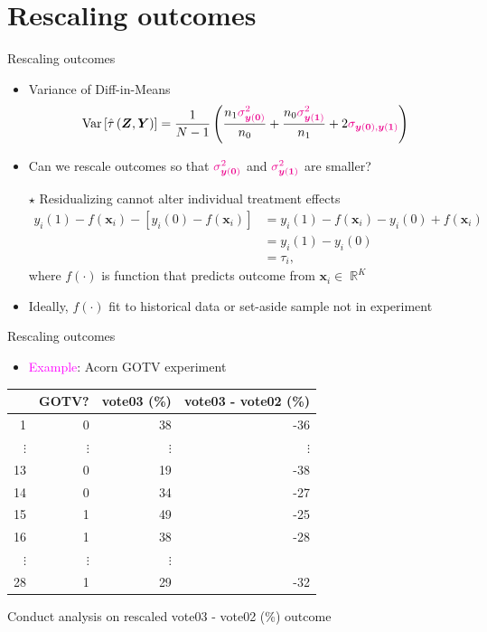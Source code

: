 \documentclass[table, xcolor = {dvipsnames}, 9pt]{beamer}
\theoremstyle{plain}
\newcommand{\mh}[1]{{\color{magenta}{#1}}}
\DeclareMathOperator{\R}{\mathbb{R}}
\DeclareMathOperator{\Var}{\rm{Var}}
\begin{document}
\section{Rescaling outcomes}
\begin{frame}{Rescaling outcomes}
\vfill
\begin{itemize} \vfill
\item Variance of Diff-in-Means \vfill
\begin{equation*}
\Var\left[\hat{\tau}\left(\bm{Z}, \bm{Y}\right)\right] = \frac{1}{N - 1}\left(\frac{n_1 \mh{\sigma^2_{\bm{y}(\bm{0})}}}{n_0} + \frac{n_0\mh{\sigma^2_{\bm{y}(\bm{1})}}}{n_1} + 2\mh{\sigma_{\bm{y}(\bm{0}), \bm{y}(\bm{1})}}\right)
\end{equation*} \vfill
\item Can we rescale outcomes so that $\mh{\sigma^2_{\bm{y}(\bm{0})}}$ and $\mh{\sigma^2_{\bm{y}(\bm{1})}}$ are smaller?  \vfill
\item[$\star$] Residualizing cannot alter individual treatment effects
\begin{align*}
y_{i}(1) - f(\bm{x}_i) - \left[y_{i}(0) - f(\bm{x}_i)\right] & = y_{i}(1) - f(\bm{x}_i) - y_{i}(0) + f(\bm{x}_i) \\ 
& = y_{i}(1) - y_{i}(0) \\ 
& = \tau_i,
\end{align*}\vfill
where $f(\cdot)$ is function that predicts outcome from $\bm{x}_i \in \R^K$ \\ 
\citep{rosenbaum2002c} \vfill
\item Ideally, $f(\cdot)$ fit to historical data or set-aside sample not in experiment \vfill
\end{itemize} \vfill
\end{frame}
\begin{frame}{Rescaling outcomes}
\vfill
\begin{itemize} \vfill
\item \textcolor{magenta}{Example}: Acorn GOTV experiment \citep{arceneaux2005}
\end{itemize} 
\begin{center}
  \begin{tabular}{r|rrr}
  \hline
 & GOTV? & vote03 (\%) & vote03 - vote02 (\%) \\
  \hline
1 & 0 & 38 & -36 \\
$\vdots$& $\vdots$& $\vdots$ & $\vdots$ \\
13 & 0 & 19 & -38 \\
14 & 0 & 34 & -27 \\
15 & 1 & 49 & -25 \\
16 & 1 & 38 & -28 \\
$\vdots$& $\vdots$& $\vdots$ & \\
28 & 1 & 29 & -32\\
   \hline
\end{tabular}
\end{center} \vfill
Conduct analysis on rescaled vote03 - vote02 (\%) outcome
\end{frame}
\end{document}
